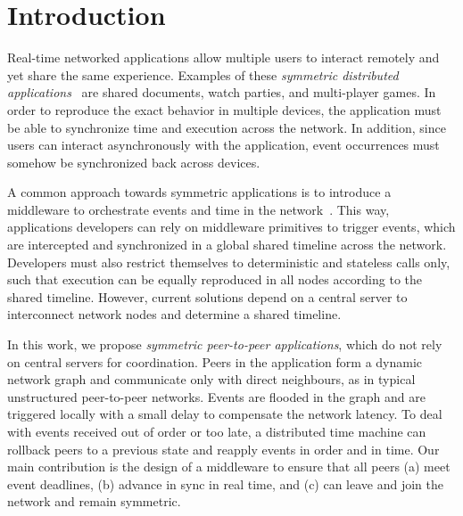 \documentclass[fleqn,10pt]{SelfArx}
\affiliation{\textsuperscript{1}\textit{Department of Computer Science, Rio de Janeiro State University (UERJ), Brazil}}
\affiliation{*\textbf{Corresponding author}: francisco@ime.uerj.br}
\begin{document}

\flushbottom %
\maketitle %
\thispagestyle{empty} %

\section{Introduction} %
\label{sec.introduction}

Real-time networked applications allow multiple users to interact remotely and
yet share the same experience.
Examples of these \emph{symmetric distributed applications}~\cite{gals} are
shared documents, watch parties, and multi-player games.
%
In order to reproduce the exact behavior in multiple devices, the application
must be able to synchronize time and execution across the network.
In addition, since users can interact asynchronously with the application,
event occurrences must somehow be synchronized back across devices.

A common approach towards symmetric applications is to introduce a middleware
to orchestrate events and time in the network~\cite{gals,croquet}.
This way, applications developers can rely on middleware primitives to trigger
events, which are intercepted and synchronized in a global shared timeline
across the network.
Developers must also restrict themselves to deterministic and stateless calls
only, such that execution can be equally reproduced in all nodes according to
the shared timeline.
However, current solutions depend on a central server to interconnect network
nodes and determine a shared timeline.

In this work, we propose \emph{symmetric peer-to-peer applications}, which
do not rely on central servers for coordination.
Peers in the application form a dynamic network graph and communicate only
with direct neighbours, as in typical unstructured peer-to-peer networks.
Events are flooded in the graph and are triggered locally with a small delay
to compensate the network latency.
To deal with events received out of order or too late, a distributed time
machine can rollback peers to a previous state and reapply events in order and
in time.
Our main contribution is the design of a middleware to ensure that all peers
    (a) meet event deadlines,
    (b) advance in sync in real time, and
    (c) can leave and join the network and remain symmetric.
\end{document}
